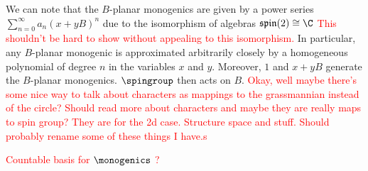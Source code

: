 We can note that the $B$-planar monogenics are given by a power series $\sum_{n=0}^\infty a_n (x+yB)^n$ due to the isomorphism of algebras $\mathfrak{spin}(2)\cong \C$ \textcolor{red}{This shouldn't be hard to show without appealing to this isomorphism.} In particular, any $B$-planar monogenic is approximated arbitrarily closely by a homogeneous polynomial of degree $n$ in the variables $x$ and $y$. Moreover, $1$ and $x+yB$ generate the $B$-planar monogenics. $\spingroup$ then acts on $B$. \textcolor{red}{Okay, well maybe there's some nice way to talk about characters as mappings to the grassmannian instead of the circle? Should read more about characters and maybe they are really maps to spin group? They are for the 2d case. Structure space and stuff. Should probably rename some of these things I have.s}


\textcolor{red}{Countable basis for $\monogenics$ ?}